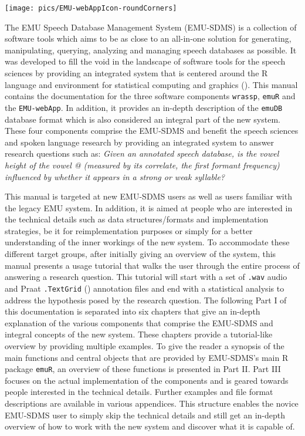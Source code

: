 \documentclass[]{book}
\begin{document}
\begin{center}\texttt{[image: pics/EMU-webAppIcon-roundCorners]} \end{center}

The EMU Speech Database Management System (EMU-SDMS) is a collection of software tools which aims to be as close to an all-in-one solution for generating, manipulating, querying, analyzing and managing speech databases as possible. It was developed to fill the void in the landscape of software tools for the speech sciences by providing an integrated system that is centered around the R language and environment for statistical computing and graphics (\citet{r-core-team:2016a}). This manual contains the documentation for the three software components \texttt{wrassp}, \texttt{emuR} and the \texttt{EMU-webApp}. In addition, it provides an in-depth description of the \texttt{emuDB} database format which is also considered an integral part of the new system. These four components comprise the EMU-SDMS and benefit the speech sciences and spoken language research by providing an integrated system to answer research questions such as: \emph{Given an annotated speech database, is the vowel height of the vowel @ (measured by its correlate, the first formant frequency) influenced by whether it appears in a strong or weak syllable?}

This manual is targeted at new EMU-SDMS users as well as users familiar with the legacy EMU system. In addition, it is aimed at people who are interested in the technical details such as data structures/formats and implementation strategies, be it for reimplementation purposes or simply for a better understanding of the inner workings of the new system. To accommodate these different target groups, after initially giving an overview of the system, this manual presents a usage tutorial that walks the user through the entire process of answering a research question. This tutorial will start with a set of \texttt{.wav} audio and Praat \texttt{.TextGrid} (\citet{boersma:2011a}) annotation files and end with a statistical analysis to address the hypothesis posed by the research question. The following Part I of this documentation is separated into six chapters that give an in-depth explanation of the various components that comprise the EMU-SDMS and integral concepts of the new system. These chapters provide a tutorial-like overview by providing multiple examples. To give the reader a synopsis of the main functions and central objects that are provided by EMU-SDMS's main R package \texttt{emuR}, an overview of these functions is presented in Part II. Part III focuses on the actual implementation of the components and is geared towards people interested in the technical details. Further examples and file format descriptions are available in various appendices. This structure enables the novice EMU-SDMS user to simply skip the technical details and still get an in-depth overview of how to work with the new system and discover what it is capable of.
\end{document}
